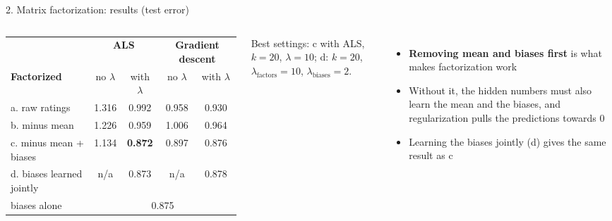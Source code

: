 \documentclass[aspectratio=169,11pt]{beamer}
\newcommand{\key}[1]{\textcolor{accent}{\textbf{#1}}}
\newcommand{\muted}[1]{\textcolor{soft}{#1}}
\begin{document}
\begin{frame}{2. Matrix factorization: results (test error)}
\begin{columns}[c]
\footnotesize\setlength{\tabcolsep}{4pt}
\begin{tabular}{@{}lcccc@{}}
\toprule
 & \multicolumn{2}{c}{\textbf{ALS}} & \multicolumn{2}{c}{\textbf{Gradient descent}} \\
\textbf{Factorized} & no $\lambda$ & with $\lambda$ & no $\lambda$ & with $\lambda$ \\
\midrule
a. raw ratings & 1.316 & 0.992 & 0.958 & 0.930 \\
b. minus mean & 1.226 & 0.959 & 1.006 & 0.964 \\
c. minus mean + biases & 1.134 & \key{0.872} & 0.897 & 0.876 \\
d. biases learned jointly & n/a & 0.873 & n/a & 0.878 \\
\midrule
\muted{biases alone} & \multicolumn{4}{c}{\muted{0.875}} \\
\bottomrule
\end{tabular}

\vspace{0.4em}
\muted{\footnotesize Best settings: c with ALS, $k = 20$, $\lambda = 10$;
d: $k = 20$, $\lambda_{\text{factors}} = 10$, $\lambda_{\text{biases}} = 2$.}
\begin{itemize}\small
  \item \key{Removing mean and biases first} is what makes factorization work
  \item Without it, the hidden numbers must also learn the mean and the biases, and regularization pulls the predictions towards 0
  \item Learning the biases jointly (d) gives the same result as c
\end{itemize}
\end{columns}
\end{frame}
\end{document}
